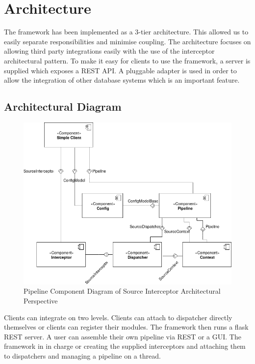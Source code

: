 \chapter{Architecture}
  \vspace{-2em}
  The framework has been implemented as a 3-tier architecture. This allowed us to easily
  separate responsibilities and minimise coupling. The architecture focuses on allowing
  third party integrations easily with the use of the interceptor architectural pattern.
  To make it easy for clients to use the framework, a server is supplied which exposes
  a REST API. A pluggable adapter is used in order to allow the integration of other
  database systems which is an important feature.

  \section{Architectural Diagram}
  \begin{figure}[H]
   \includegraphics[width = .8\linewidth]{diagrams/architecture_component.png}
   \caption{Pipeline Component Diagram of Source Interceptor Architectural Perspective}
  \end{figure}
  Clients can integrate on two levels. Clients can attach to dispatcher directly themselves or
  clients can register their modules. The framework then runs a flask REST server.
  A user can assemble their own pipeline via REST or a GUI. The framework in in charge or creating
  the supplied interceptors and attaching them to dispatchers and managing a pipeline on a thread.

